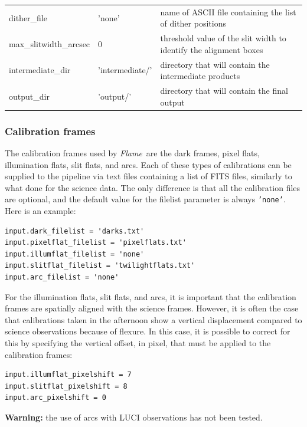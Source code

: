 \documentclass[a4paper]{article}
\newcommand{\flame}{\emph{Flame}}
\begin{document}
\begin{sloppypar}
\begin{table}
{\begin{tabular}{lll}
dither\_file       		& 'none' 				& name of ASCII file containing the list of dither positions \\
max\_slitwidth\_arcsec & 0          & threshold value of the slit width to identify the alignment boxes \\
intermediate\_dir		 & 'intermediate/'		& directory that will contain the intermediate products \\
output\_dir				   & 'output/'			& directory that will contain the final output \\
\hline
\end{tabular}
}
\end{table}


\subsubsection{Calibration frames}
The calibration frames used by \flame\ are the dark frames, pixel flats, illumination flats, slit flats, and arcs. Each of these types of calibrations can be supplied to the pipeline via text files containing a list of FITS files, similarly to what done for the science data. The only difference is that all the calibration files are optional, and the default value for the filelist parameter is always \texttt{'none'}. Here is an example:
\begin{lstlisting}
input.dark_filelist = 'darks.txt'
input.pixelflat_filelist = 'pixelflats.txt'
input.illumflat_filelist = 'none'
input.slitflat_filelist = 'twilightflats.txt'
input.arc_filelist = 'none'
\end{lstlisting}
For the illumination flats, slit flats, and arcs, it is important that the calibration frames are spatially aligned with the science frames. However, it is often the case that calibrations taken in the afternoon show a vertical displacement compared to science observations because of flexure. In this case, it is possible to correct for this by specifying the vertical offset, in pixel, that must be applied to the calibration frames:
\begin{lstlisting}
input.illumflat_pixelshift = 7
input.slitflat_pixelshift = 8
input.arc_pixelshift = 0
\end{lstlisting}

\textbf{Warning:} the use of arcs with LUCI observations has not been tested.



\end{sloppypar}
\end{document}
